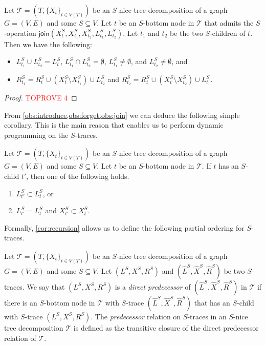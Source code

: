 \documentclass[a4paper,UKenglish,cleveref, autoref, thm-restate, numberwithinsect]{lipics-v2021}
\newcommand{\join}{\mathsf{join}}
\begin{document}
\begin{observation}\label{obs:join}
    Let $\mathcal{T}=(T,\{X_t\}_{t\in V(T)})$ be an $S$-nice tree decomposition of a graph $G=(V,E)$ and some $S\subseteq V$. Let $t$ be an $S$-bottom node in $\mathcal{T}$ that admits the $S$-operation $\join(X^S_t,X_{t_1}^S, X_{t_2}^S,L_{t_1}^S, L_{t_2}^S)$. Let $t_1$ and $t_2$ be the two $S$-children of $t$.
    Then we have the following:
    \begin{itemize}
        \item $L_{t_1}^S\cup L_{t_2}^S= L_{t}^S$, $L_{t_1}^S\cap L_{t_2}^S= \emptyset$, $L_{t_1}^S\neq\emptyset$, and $L_{t_2}^S\neq\emptyset$, and
\item $R_{t_1}^S=R_{t}^S\cup (X_t^S \setminus X_{t_1}^S)\cup L_{t_2}^S$ and $R_{t_2}^S=R_{t}^S\cup (X_t^S \setminus X_{t_2}^S)\cup L_{t_1}^S$.
    \end{itemize}
\end{observation}
\begin{proof}\textcolor{red}{TOPROVE 4}\end{proof}

From \cref{obs:introduce,obs:forget,obs:join} we can deduce the following simple corollary. This is the main reason that enables us to perform dynamic programming on the $S$-traces.

\begin{corollary}\label{cor:recursion}
    Let $\mathcal{T}=(T,\{X_t\}_{t\in V(T)})$ be an $S$-nice tree decomposition of a graph $G=(V,E)$ and some $S\subseteq V$. Let $t$ be an $S$-bottom node in $\mathcal{T}$. If $t$ has an $S$-child $t'$, then one of the following holds.
    \begin{enumerate}
        \item $L_{t'}^S\subset L_t^S$, or
        \item $L_{t'}^S = L_t^S$ and $X_{t'}^S\subset X_t^S$.
    \end{enumerate}
\end{corollary}

Formally, \cref{cor:recursion} allows us to define the following partial ordering for $S$-traces.
\begin{definition}\label{def:predecingstraces}
Let $\mathcal{T}=(T,\{X_t\}_{t\in V(T)})$ be an $S$-nice tree decomposition of a graph $G=(V,E)$ and some $S\subseteq V$. Let $(L^S,X^S,R^S)$ and $(\hat{L}^S,\hat{X}^S,\hat{R}^S)$ be two $S$-traces. We say that $(L^S,X^S,R^S)$ is a \emph{direct predecessor} of $(\hat{L}^S,\hat{X}^S,\hat{R}^S)$ in $\mathcal{T}$ if there is an $S$-bottom node in $\mathcal{T}$ with $S$-trace $(\hat{L}^S,\hat{X}^S,\hat{R}^S)$ that has an $S$-child with $S$-trace $(L^S,X^S,R^S)$. The \emph{predecessor} relation on $S$-traces in an $S$-nice tree decomposition $\mathcal{T}$ is defined as the transitive closure of the direct predecessor relation of $\mathcal{T}$.
\end{definition}
\end{document}
